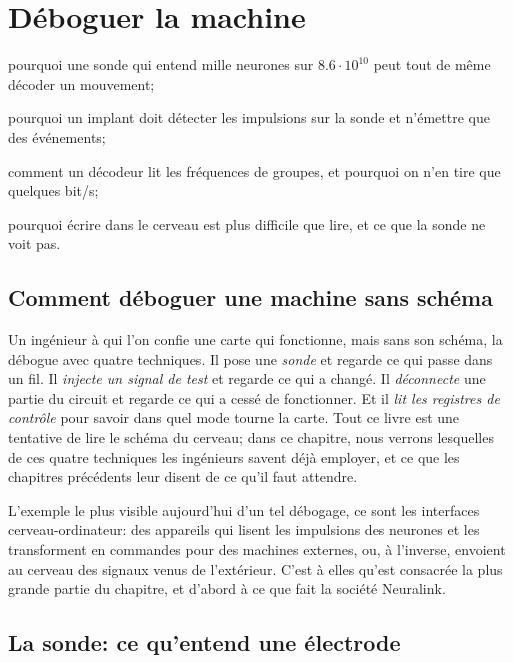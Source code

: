 \chapter{Déboguer la machine}
\label{sec:debugging}
\begin{chaptergoals}
\item pourquoi une sonde qui entend mille neurones sur $8.6\cdot10^{10}$ peut tout de même décoder un mouvement;
\item pourquoi un implant doit détecter les impulsions sur la sonde et n'émettre que des événements;
\item comment un décodeur lit les fréquences de groupes, et pourquoi on n'en tire que quelques bit/s;
\item pourquoi écrire dans le cerveau est plus difficile que lire, et ce que la sonde ne voit pas.
\end{chaptergoals}

\section{Comment déboguer une machine sans schéma}

Un ingénieur à qui l'on confie une carte qui fonctionne, mais sans son schéma, la débogue avec quatre techniques. Il pose une \emph{sonde} et regarde ce qui passe dans un fil. Il \emph{injecte un signal de test} et regarde ce qui a changé. Il \emph{déconnecte} une partie du circuit et regarde ce qui a cessé de fonctionner. Et il \emph{lit les registres de contrôle} pour savoir dans quel mode tourne la carte. Tout ce livre est une tentative de lire le schéma du cerveau; dans ce chapitre, nous verrons lesquelles de ces quatre techniques les ingénieurs savent déjà employer, et ce que les chapitres précédents leur disent de ce qu'il faut attendre.

L'exemple le plus visible aujourd'hui d'un tel débogage, ce sont les interfaces cerveau-ordinateur: des appareils qui lisent les impulsions des neurones et les transforment en commandes pour des machines externes, ou, à l'inverse, envoient au cerveau des signaux venus de l'extérieur. C'est à elles qu'est consacrée la plus grande partie du chapitre, et d'abord à ce que fait la société Neuralink.

\section{La sonde: ce qu'entend une électrode}

